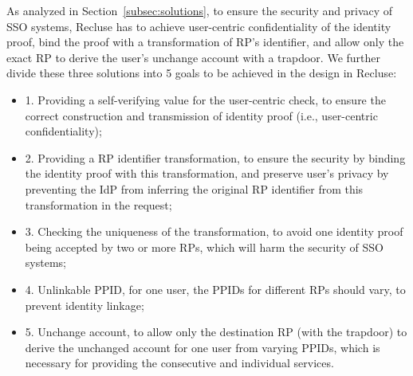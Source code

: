 As analyzed in Section~\ref{subsec:solutions}, to ensure the security and privacy of SSO systems, Recluse has to achieve user-centric confidentiality of the identity proof, bind the proof with a transformation of RP’s identifier, and allow only the exact RP to derive the user's unchange account with a trapdoor. We further divide these three solutions into 5 goals to be achieved in the design in Recluse:
\begin{itemize}
  \item 1. Providing a self-verifying value for the user-centric check, to ensure the correct construction and transmission of identity proof (i.e., user-centric confidentiality);
  \item 2. Providing a RP identifier transformation, to ensure the security by binding the identity proof with this transformation, and preserve user's privacy by preventing the IdP from inferring the original RP identifier from this transformation in the request;
  \item 3. Checking the uniqueness of the transformation, to avoid one identity proof being accepted by two or more RPs, which will harm the security of SSO systems;
  \item 4. Unlinkable PPID, for one user, the PPIDs for different RPs should vary, to prevent identity linkage;
  \item 5. Unchange account, to allow only the destination RP (with the trapdoor) to derive the unchanged account for one user from varying PPIDs, which is necessary for providing the consecutive and individual services.
\end{itemize}


